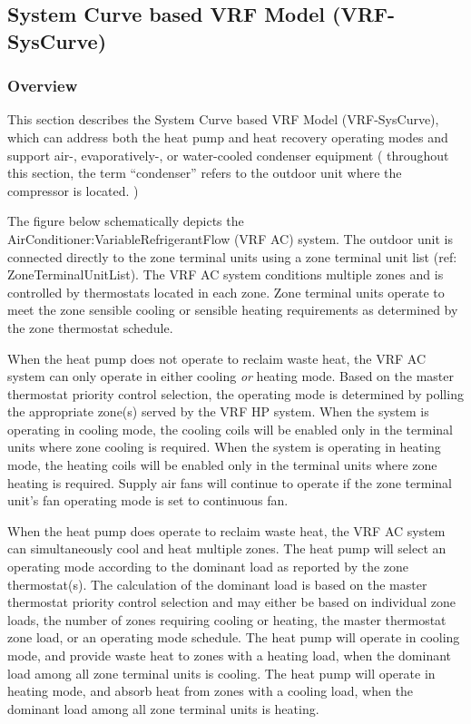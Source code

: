 \subsection{System Curve based VRF Model (VRF-SysCurve)}\label{variable-refrigerant-flow-heat-pump-model-system-curve-based-model}

\subsubsection{Overview}\label{overview-028}

This section describes the System Curve based VRF Model (VRF-SysCurve), which can address both the heat pump and heat recovery operating modes and support air-, evaporatively-, or water-cooled condenser equipment ( throughout this section, the term ``condenser'' refers to the outdoor unit where the compressor is located. )

The figure below schematically depicts the AirConditioner:VariableRefrigerantFlow (VRF AC) system. The outdoor unit is connected directly to the zone terminal units using a zone terminal unit list (ref: ZoneTerminalUnitList). The VRF AC system conditions multiple zones and is controlled by thermostats located in each zone. Zone terminal units operate to meet the zone sensible cooling or sensible heating requirements as determined by the zone thermostat schedule.

When the heat pump does not operate to reclaim waste heat, the VRF AC system can only operate in either cooling \emph{or} heating mode. Based on the master thermostat priority control selection, the operating mode is determined by polling the appropriate zone(s) served by the VRF HP system. When the system is operating in cooling mode, the cooling coils will be enabled only in the terminal units where zone cooling is required. When the system is operating in heating mode, the heating coils will be enabled only in the terminal units where zone heating is required. Supply air fans will continue to operate if the zone terminal unit's fan operating mode is set to continuous fan.

When the heat pump does operate to reclaim waste heat, the VRF AC system can simultaneously cool and heat multiple zones. The heat pump will select an operating mode according to the dominant load as reported by the zone thermostat(s). The calculation of the dominant load is based on the master thermostat priority control selection and may either be based on individual zone loads, the number of zones requiring cooling or heating, the master thermostat zone load, or an operating mode schedule. The heat pump will operate in cooling mode, and provide waste heat to zones with a heating load, when the dominant load among all zone terminal units is cooling. The heat pump will operate in heating mode, and absorb heat from zones with a cooling load, when the dominant load among all zone terminal units is heating.

